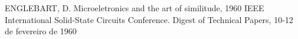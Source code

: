 \documentclass[
12pt,		%
openright,	%
twoside,  %
a4paper,			%
chapter=TITLE,		%
english,			%
french,				%
spanish,			%
brazil				%
]{USPSC-classe/USPSC}
\begin{document}
\begin{flushleft}
\begin{flushleft}
\begin{flushleft}
\begin{flushleft}
\begin{flushleft}
\begin{flushleft}
\begin{flushleft}
\begin{flushleft}
\begin{flushleft}
\begin{flushleft}
\begin{flushleft}
\begin{flushleft}
\begin{flushleft}
\begin{flushleft}
[ENGLEBART, 2017] ENGLEBART, D. Microeletronics and the art of similitude, 1960 IEEE International Solid-State Circuits Conference. Digest of Technical Papers, 10-12 de fevereiro de 1960
\end{flushleft}


\end{flushleft}


\end{flushleft}


\end{flushleft}


\end{flushleft}


\end{flushleft}


\end{flushleft}


\end{flushleft}


\end{flushleft}


\end{flushleft}


\end{flushleft}


\end{flushleft}


\end{flushleft}


\end{flushleft}
\end{document}
